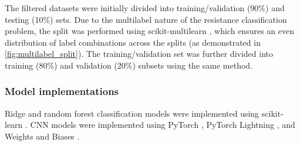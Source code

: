 \documentclass[english,11pt,a4paper,titlepage]{article}
\begin{document}
	The filtered datasets were initially divided into training/validation (90\%) and testing (10\%) sets. Due to the multilabel nature of the resistance classification problem, the split was performed using scikit-multilearn \cite{2017arXiv170201460S}, which ensures an even distribution of label combinations across the splits (as demonstrated in \ref{fig:multilabel_split}). The training/validation set was further divided into training (80\%) and validation (20\%) subsets using the same method.
	
	\subsubsection*{Model implementations}
	Ridge and random forest classification models were implemented using scikit-learn \cite{scikit-learn}. CNN models were implemented using PyTorch \cite{NEURIPS2019_9015}, PyTorch Lightning \cite{falcon2019pytorch}, and Weights and Biases \cite{wandb}.
	
\end{document}
